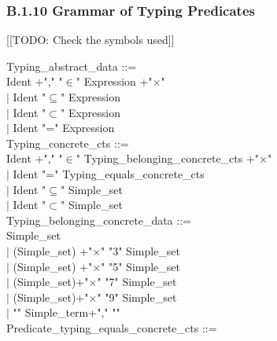 \documentclass[12pt,a4paper,draft]{article}
\begin{document}
\subsubsection{B.1.10 Grammar of Typing Predicates} 
[[TODO: Check the symbols used]]
\footnotesize{
\begin{sloppypar} 


Typing\_abstract\_data ::= \\ 
\hspace*{0.20in}  Ident +","  "$\in$"  Expression +"$\times$"\\ 
\hspace*{0.20in} $|$ Ident  "$\subseteq$"  Expression\\ 
\hspace*{0.20in} $|$ Ident  "$\subset$"  Expression\\ 
\hspace*{0.20in} $|$ Ident  "="  Expression \\ 
Typing\_concrete\_cts ::= \\ 
\hspace*{0.20in}   Ident +","   "$\in$"  Typing\_belonging\_concrete\_cts +"$\times$"\\
\hspace*{0.20in} $|$ Ident  "="  Typing\_equals\_concrete\_cts  \\ 
\hspace*{0.20in} $|$ Ident  "$\subseteq$"  Simple\_set  \\ 
\hspace*{0.20in} $|$ Ident  "$\subset$"  Simple\_set\\ 
Typing\_belonging\_concrete\_data ::= \\ 
\hspace*{0.20in}   Simple\_set \\
\hspace*{0.20in} $|$ (Simple\_set) +"$\times$"  "3"  Simple\_set  \\ 
\hspace*{0.20in} $|$ (Simple\_set) +"$\times$"  "5"  Simple\_set  \\ 
\hspace*{0.20in} $|$ (Simple\_set)+"$\times$"  "7"  Simple\_set  \\ 
\hspace*{0.20in} $|$ (Simple\_set)+"$\times$"  "9"  Simple\_set  \\ 
\hspace*{0.20in} $|$ "{" Simple\_term+","   "}" \\ 
Predicate\_typing\_equals\_concrete\_cts ::= \\ 

\end{sloppypar}}
\end{document}
